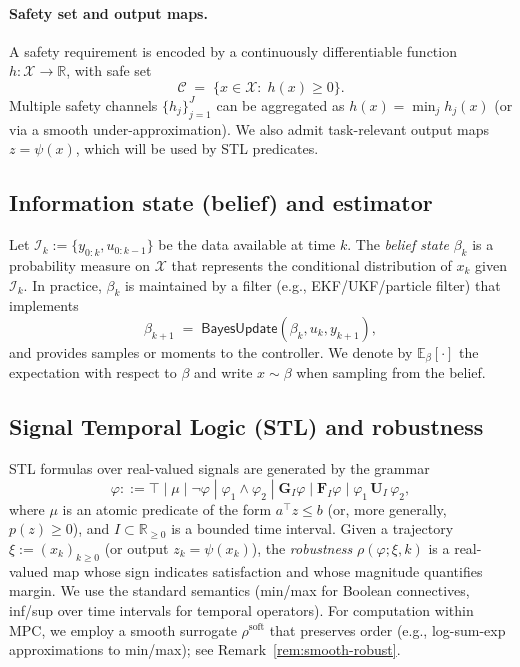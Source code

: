 \documentclass[journal]{IEEEtran}
\theoremstyle{definition}
\begin{document}
\paragraph*{Safety set and output maps.}
A safety requirement is encoded by a continuously differentiable function
$h:\mathcal{X}\rightarrow\mathbb{R}$, with safe set
\begin{equation}
  \mathcal{C} \;=\; \{x\in\mathcal{X}:\; h(x)\ge 0\}.
  \label{eq:safe-set}
\end{equation}
Multiple safety channels $\{h_j\}_{j=1}^{J}$ can be aggregated as $h(x)\!=\!\min_j h_j(x)$ (or via a
smooth under-approximation). We also admit task-relevant output maps $z = \psi(x)$, which will be
used by STL predicates.

\subsection{Information state (belief) and estimator}
Let $\mathcal{I}_k:=\{y_{0:k},u_{0:k-1}\}$ be the data available at time $k$.
The \emph{belief state} $\beta_k$ is a probability measure on $\mathcal{X}$ that represents the
conditional distribution of $x_k$ given $\mathcal{I}_k$.
In practice, $\beta_k$ is maintained by a filter (e.g., EKF/UKF/particle filter) that implements
\begin{equation}
  \beta_{k+1} \;=\; \mathsf{BayesUpdate}(\beta_k,u_k,y_{k+1}),
  \label{eq:belief-update}
\end{equation}
and provides samples or moments to the controller. We denote by
$\mathbb{E}_{\beta}[\cdot]$ the expectation with respect to $\beta$ and write $x\sim\beta$
when sampling from the belief.

\subsection{Signal Temporal Logic (STL) and robustness}
STL formulas over real-valued signals are generated by the grammar
\[
\varphi ::= \top \;|\; \mu \;|\; \neg\varphi \;|\; \varphi_1\wedge\varphi_2
\;|\; \mathbf{G}_{I}\varphi \;|\; \mathbf{F}_{I}\varphi \;|\; \varphi_1 \,\mathbf{U}_{I}\, \varphi_2,
\]
where $\mu$ is an atomic predicate of the form $a^\top z \le b$ (or, more generally, $p(z)\ge 0$),
and $I\subset\mathbb{R}_{\ge 0}$ is a bounded time interval.
Given a trajectory $\xi := (x_k)_{k\ge 0}$ (or output $z_k=\psi(x_k)$), the \emph{robustness}
$\rho(\varphi;\xi,k)$ is a real-valued map whose sign indicates satisfaction and whose magnitude
quantifies margin. We use the standard semantics (min/max for Boolean connectives, inf/sup over
time intervals for temporal operators). For computation within MPC, we employ a smooth surrogate
$\rho^{\text{soft}}$ that preserves order (e.g., log-sum-exp approximations to min/max); see
Remark~\ref{rem:smooth-robust}.
\end{document}
